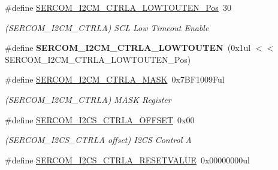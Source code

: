 \begin{DoxyCompactItemize}
\item 
\hypertarget{group___s_a_m_l21___s_e_r_c_o_m_ga2154f82ce451e048c1454d5be4dd8cf2}{}\#define \hyperlink{group___s_a_m_l21___s_e_r_c_o_m_ga2154f82ce451e048c1454d5be4dd8cf2}{S\+E\+R\+C\+O\+M\+\_\+\+I2\+C\+M\+\_\+\+C\+T\+R\+L\+A\+\_\+\+L\+O\+W\+T\+O\+U\+T\+E\+N\+\_\+\+Pos}~30\label{group___s_a_m_l21___s_e_r_c_o_m_ga2154f82ce451e048c1454d5be4dd8cf2}

\begin{DoxyCompactList}\small\item\em (S\+E\+R\+C\+O\+M\+\_\+\+I2\+C\+M\+\_\+\+C\+T\+R\+L\+A) S\+C\+L Low Timeout Enable \end{DoxyCompactList}\item 
\hypertarget{group___s_a_m_l21___s_e_r_c_o_m_gaa80dd0840735bcc2a4f1742fc138c60c}{}\#define {\bfseries S\+E\+R\+C\+O\+M\+\_\+\+I2\+C\+M\+\_\+\+C\+T\+R\+L\+A\+\_\+\+L\+O\+W\+T\+O\+U\+T\+E\+N}~(0x1ul $<$$<$ S\+E\+R\+C\+O\+M\+\_\+\+I2\+C\+M\+\_\+\+C\+T\+R\+L\+A\+\_\+\+L\+O\+W\+T\+O\+U\+T\+E\+N\+\_\+\+Pos)\label{group___s_a_m_l21___s_e_r_c_o_m_gaa80dd0840735bcc2a4f1742fc138c60c}

\item 
\hypertarget{group___s_a_m_l21___s_e_r_c_o_m_gab2dfd997fc90aa20ad74dc23c0fe9ba4}{}\#define \hyperlink{group___s_a_m_l21___s_e_r_c_o_m_gab2dfd997fc90aa20ad74dc23c0fe9ba4}{S\+E\+R\+C\+O\+M\+\_\+\+I2\+C\+M\+\_\+\+C\+T\+R\+L\+A\+\_\+\+M\+A\+S\+K}~0x7\+B\+F1009\+Ful\label{group___s_a_m_l21___s_e_r_c_o_m_gab2dfd997fc90aa20ad74dc23c0fe9ba4}

\begin{DoxyCompactList}\small\item\em (S\+E\+R\+C\+O\+M\+\_\+\+I2\+C\+M\+\_\+\+C\+T\+R\+L\+A) M\+A\+S\+K Register \end{DoxyCompactList}\item 
\hypertarget{group___s_a_m_l21___s_e_r_c_o_m_ga1067b06275a77794a4469ce9f4ea2068}{}\#define \hyperlink{group___s_a_m_l21___s_e_r_c_o_m_ga1067b06275a77794a4469ce9f4ea2068}{S\+E\+R\+C\+O\+M\+\_\+\+I2\+C\+S\+\_\+\+C\+T\+R\+L\+A\+\_\+\+O\+F\+F\+S\+E\+T}~0x00\label{group___s_a_m_l21___s_e_r_c_o_m_ga1067b06275a77794a4469ce9f4ea2068}

\begin{DoxyCompactList}\small\item\em (S\+E\+R\+C\+O\+M\+\_\+\+I2\+C\+S\+\_\+\+C\+T\+R\+L\+A offset) I2\+C\+S Control A \end{DoxyCompactList}\item 
\hypertarget{group___s_a_m_l21___s_e_r_c_o_m_ga306c2269e1d97f1bb455bf1fc112993c}{}\#define \hyperlink{group___s_a_m_l21___s_e_r_c_o_m_ga306c2269e1d97f1bb455bf1fc112993c}{S\+E\+R\+C\+O\+M\+\_\+\+I2\+C\+S\+\_\+\+C\+T\+R\+L\+A\+\_\+\+R\+E\+S\+E\+T\+V\+A\+L\+U\+E}~0x00000000ul\label{group___s_a_m_l21___s_e_r_c_o_m_ga306c2269e1d97f1bb455bf1fc112993c}


\end{DoxyCompactItemize}
